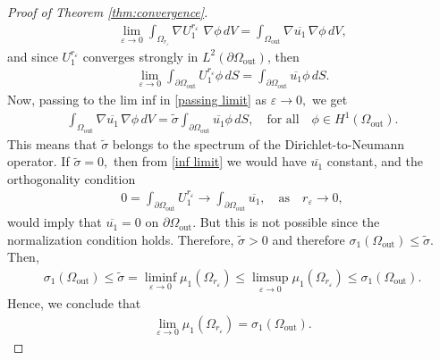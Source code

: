 \documentclass[12pt,reqno]{amsart}
\numberwithin{equation}{section}
\numberwithin{theorem}{section}
\numberwithin{equation}{section}
\numberwithin{theorem}{section}
\begin{document}
\begin{proof}[Proof of Theorem \ref{thm:convergence}]
\begin{align*}
    \lim_{\varepsilon \to 0} \int_{\Omega_{r_\varepsilon}}  \nabla U_1^{r_\varepsilon}\,\, \nabla\phi \, dV = \int_{ \Omega_{\mathrm{out}}} \nabla \overline{u_1} \, \nabla \phi \,dV ,
\end{align*}
and since $U_1^{r_\varepsilon}$ converges strongly in $L^2(\partial \Omega_{\mathrm{out}})$, then
\begin{align*}
    \lim_{\varepsilon \to 0} \int_{\partial \Omega_{\mathrm{out}}} U_1^{r_\varepsilon} \phi \, dS = \int_{\partial \Omega_{\mathrm{out}}} \overline{u_1} \phi \, dS.
\end{align*}
Now, passing to the lim inf in  \eqref{passing limit} as $\varepsilon \to 0,$ we get 
 \begin{align} \label{inf limit}
      \int_{ \Omega_{\mathrm{out}}} \nabla \overline{u_1} \, \nabla \phi \,dV =\tilde{\sigma} \int_{\partial \Omega_{\mathrm{out}}} \overline{u_1} \phi \, dS, \quad \text{for all} \quad \phi \in H^1(\Omega_{\mathrm{out}}).
 \end{align}
This means that $\tilde{\sigma}$ belongs to the spectrum of the Dirichlet-to-Neumann operator.
If $\tilde{\sigma}=0,$ then from \eqref{inf limit} we would have $\overline{u_1}$  constant, and the orthogonality condition 
\begin{align*}
    0=\int_{\partial \Omega_\mathrm{out}} U_1^{r_\varepsilon} \to \int_{\partial \Omega_{\mathrm{out}}} \overline{u_1}, \quad\text{as}\quad r_\varepsilon\to 0,
\end{align*}
would imply that $\overline{u_1}=0$ on ${\partial \Omega_{\mathrm{out}}}$. But this is not possible since the normalization condition holds. Therefore, $\tilde{\sigma} >0$ and therefore $\sigma_1({\Omega_{\mathrm{out}}})\leq \tilde{\sigma}.$    
 Then, 
 \begin{align*}
     \sigma_1({\Omega_{\mathrm{out}}})\leq \tilde{\sigma}= \liminf_{\varepsilon \to 0} \mu_1(\Omega_{r_\varepsilon})\leq\limsup_{\varepsilon \to 0} \mu_1(\Omega_{r_\varepsilon})\leq \sigma_1({\Omega_{\mathrm{out}}}).
 \end{align*}
 Hence, we conclude that 
 \begin{align*}
     \lim_{\varepsilon \to 0} \mu_1(\Omega_{r_\varepsilon})= \sigma_1({\Omega_{\mathrm{out}}}).
 \end{align*}


\end{proof}
\end{document}
